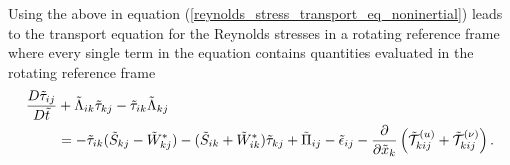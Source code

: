 \documentclass[oneside,a4paper,11pt]{report}
\begin{document}
Using the above in equation (\ref{reynolds_stress_transport_eq_noninertial}) leads to the transport equation for the Reynolds stresses in a rotating reference frame where every single term in the equation contains quantities evaluated in the rotating reference frame
\begin{align}
\frac{D \tilde{\tau}_{ij} }{D \tilde{t}} &+ \tilde{\Lambda}_{ik} \tilde{\tau}_{kj} - \tilde{\tau}_{ik} \tilde{\Lambda}_{kj} \nonumber \\
&=  -\tilde{\tau}_{ik} (\tilde{S}_{kj} - \tilde{W}^*_{kj}) - (\tilde{S}_{ik} + \tilde{W}^*_{ik} ) \tilde{\tau}_{kj} + \tilde{\Pi}_{ij} - \tilde{\epsilon}_{ij} - \frac{\partial}{\partial \tilde{x}_k} \left ( \tilde{\mathcal{T}}^{(u)}_{kij} + \tilde{\mathcal{T}}^{(\nu)}_{kij} \right ).
\end{align}


%
\end{document}
